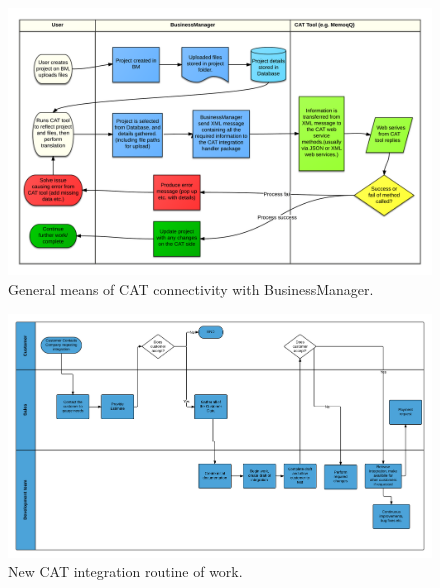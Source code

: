 \documentclass[12pt]{article}
\begin{document}
\begin{landscape}
\begin{figure}[p]
    \centering
    \includegraphics[scale=0.24]{cat}
    \caption{General means of CAT connectivity with BusinessManager.}
     \label{fig:cat}
\end{figure}
\end{landscape}

\begin{landscape}
\begin{figure}[p]
    \centering
    \includegraphics[scale=0.16]{sales}
    \caption{New CAT integration routine of work.}
     \label{fig:sales}
\end{figure}
\end{landscape}

\end{document}

